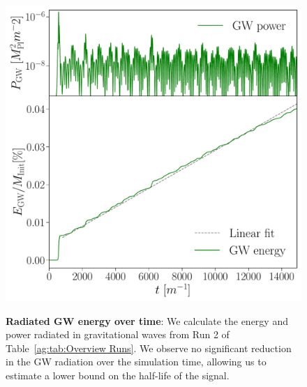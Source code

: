\begin{figure}[h!]
\begin{center}
{\includegraphics[width=0.6\columnwidth]{ag_fig/Energy_Power.pdf}}
\caption{{\bf Radiated GW energy over time}: We calculate the energy and power radiated in gravitational waves from Run 2 of Table~\ref{ag:tab:Overview Runs}.
We observe no significant reduction in the GW radiation over the simulation time, allowing us to estimate a lower bound on the half-life of the signal.
    }
\label{ag:fig:EnergyPower}
\end{center}
\end{figure}







